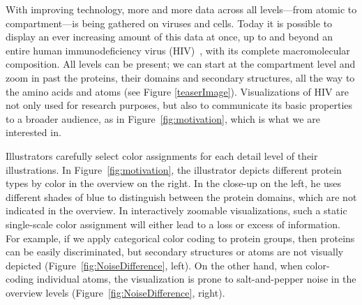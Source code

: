 \documentclass{egpubl}
\begin{document}
	With improving technology, more and more data across all levels---from atomic to compartment---is being gathered on viruses and cells. 
	Today it is possible to display an ever increasing amount of this data at once, up to and beyond an entire human immunodeficiency virus (HIV)~\cite{muzic2015cellview}, with its complete macromolecular composition.
	All levels can be present; we can start at the compartment level and zoom in past the proteins, their domains and secondary structures, all the way to the amino acids and atoms (see Figure \ref{teaserImage}). Visualizations of HIV are not only used for research purposes, but also to communicate its basic properties to a broader audience, as in Figure~\ref{fig:motivation}, which is what we are interested in.

	
	Illustrators carefully select color assignments for each detail level of their illustrations. 
	In Figure~\ref{fig:motivation}, the illustrator depicts different protein types by color in the overview on the right. 
	In the close-up on the left, he uses different shades of blue to distinguish between the protein domains, which are not indicated in the overview. 
	In interactively zoomable visualizations, such a static single-scale color assignment will either lead to a loss or excess of information. 
	For example, if we apply categorical color coding to protein groups, then proteins can be easily discriminated, but secondary structures or atoms are not visually depicted (Figure~\ref{fig:NoiseDifference}, left).
	On the other hand, when color-coding individual atoms, the visualization is prone to salt-and-pepper noise in the overview levels (Figure~\ref{fig:NoiseDifference}, right).
	
\end{document}
